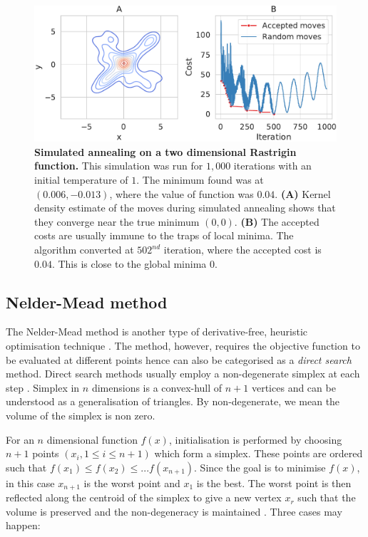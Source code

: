 \begin{figure}[H]
\center
\includegraphics[width=1\textwidth]{chapters/Introduction/Figures/simulated_annealing.pdf}
\caption[Simulated annealing on a two dimensional Rastrigin function.]{\textbf{Simulated annealing on a two dimensional Rastrigin function.} This simulation was run for $1,000$ iterations with an initial temperature of $1$. The minimum found was at $(0.006, -0.013)$, where the value of function was $0.04$.  \textbf{(A)} Kernel density estimate of the moves during simulated annealing shows that they converge near the true minimum $(0, 0)$. \textbf{(B)} The accepted costs are usually immune to the traps of local minima. The algorithm converted at $502^{nd}$ iteration, where the accepted cost is $0.04$. This is close to the global minima $0$. }%
\label{fig:sim_anneal}
\end{figure}


\subsection{Nelder-Mead method}
The Nelder-Mead method is another type of derivative-free, heuristic optimisation technique \cite{Nelder1965-zb}. The method, however, requires the objective function to be evaluated at different points hence can also be categorised as a \textit{direct search} method. Direct search methods usually employ a non-degenerate simplex at each step \cite{lagarias1998convergence}. Simplex in $n$ dimensions is a convex-hull of $n+1$ vertices and can be understood as a generalisation of triangles. By non-degenerate, we mean the volume of the simplex is non zero.


For an $n$ dimensional function $f(x)$, initialisation is performed by choosing $n+1$ points $(x_i, 1\leq i \leq n+1)$ which form a simplex. These points are ordered such that $f(x_1) \leq f(x_2) \leq ... f(x_{n+1})$. Since the goal is to minimise $f(x)$, in this case $x_{n+1}$ is the worst point and $x_1$ is the best. The worst point is then reflected along the centroid of the simplex to give a new vertex $x_r$ such that the volume is preserved and the non-degeneracy is maintained \cite{presse1988numerical}. Three cases may happen:

